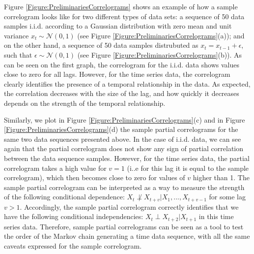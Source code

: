 Figure \ref{Figure:PreliminariesCorrelograms} shows an example of how a sample correlogram looks like for two different types of data sets: a sequence of 50 data samples i.i.d. according to a Gaussian distribution with zero mean and unit variance $x_t\sim {\mathcal N}(0,1)$ (see Figure \ref{Figure:PreliminariesCorrelograms}(a)); and on the other hand, a sequence of 50 data samples distrubuted as $x_t=x_{t-1} + \epsilon$, such that $\epsilon\sim {\mathcal N}(0,1)$ (see  Figure \ref{Figure:PreliminariesCorrelograms}(b)). As can be seen on the first graph, the correlogram for the i.i.d. data shows values close to zero for all lags. However, for the time series data, the correlogram clearly identifies the presence of a temporal relationship in the data. As expected, the correlation decreases with the size of the lag, and how quickly it decreases depends on the strength of the temporal relationship. 

Similarly, we plot in Figure \ref{Figure:PreliminariesCorrelograms}(c) and  in  Figure \ref{Figure:PreliminariesCorrelograms}(d) the sample partial correlograms for the same two data sequences presented above. In the case of i.i.d. data, we can see again that the partial correlogram does not show any sign of partial correlation between the data sequence samples. However, for the time series data, the partial correlogram takes a high value for $v=1$ (i..e for this lag it is equal to the sample correlogram), which then becomes close to zero for values of $v$ higher than 1. The sample partial correlogram can be interpreted as a way to measure the strength of the following conditional dependence: $X_t  \not\perp X_{t+v} | X_1,...,X_{t+v-1}$ for some lag $v>1$. Accordingly, the sample partial correlogram correctly identifies that we have the following conditional independencies: $X_t\perp X_{t+2}|X_{t+1}$ in this time series data. Therefore, sample partial correlograms can be seen as a tool to test the order of the Markov chain generating a time data sequence, with all the same caveats expressed for the sample correlogram. 

